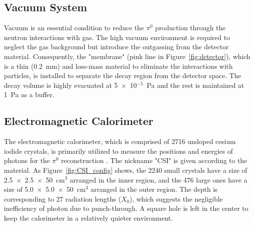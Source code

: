 
\subsection{Vacuum System}
Vacuum is an essential condition to reduce the $\pi^0$ production through the neutron interactions with gas. The high vacuum environment is required to neglect the gas background but introduce the outgassing from the detector material. Consequently, the "membrane" (pink line in Figure~\ref{fig:detector}), which is a thin (0.2~mm) and loss-mass material to eliminate the interactions with particles, is installed to separate the decay region from the detector space. The decay volume is highly evacuated at 5~$\times$~10$^{-5}$~Pa and the rest is maintained at 1~Pa as a buffer. 


\subsection{Electromagnetic Calorimeter}
The electromagnetic calorimeter, which is comprised of 2716 undoped cesium iodide crystals, is primarily utilized to measure the positions and energies of photons for the $\pi^0$ reconstruction \parencite{CSI}. The nickname "CSI" is given according to the material. As Figure~\ref{fig:CSI_config} shows, the 2240 small crystals have a size of 2.5~$\times$~2.5~$\times$~50~cm$^3$ arranged in the inner region, and the 476 large ones have a size of 5.0~$\times$~5.0~$\times$~50~cm$^3$ arranged in the outer region. The depth is corresponding to 27 radiation lengths ($X_0$), which suggests the negligible inefficiency of photon due to punch-through. A square hole is left in the center to keep the calorimeter in a relatively quieter environment. 

